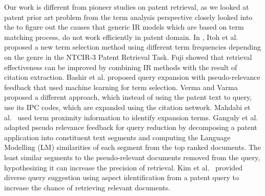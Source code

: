 

Our work is different from pioneer studies on patent retrieval, as we
looked at patent prior art problem from the term analysis perspective
closely looked into the to figure out the causes that generic IR models 
which are based on term matching process, do not work efficiently in patent domain. 
In \cite{Itoh2003}, Itoh et al. proposed a new term selection method using different term
frequencies depending on the genre in the NTCIR-3 Patent Retrieval Task.
Fuji \cite{Fujii2007}
showed that retrieval effectiveness can be improved by combining IR
methods with the result of citation extraction.
Bashir et al. \cite{Bashir2010} proposed query expansion with pseudo-relevance
feedback that used machine learning for term selection.
Verma and Varma
\cite{Verma2011} proposed a different approach, which instead of using
the patent text to query, use its IPC codes, which are expanded using the citation network.
Mahdabi et al.~\cite{Mahdabi2013} used term proximity
information to identify expansion terms. Ganguly et
al.~\cite{ganguly2011patent} adapted pseudo relevance feedback for
query reduction by decomposing a patent application into constituent
text segments and computing the Language Modelling (LM) similarities
of each segment from the top ranked documents. The least similar
segments to the pseudo-relevant documents removed from the query,
hypothesizing it can increase the precision of retrieval. Kim et
al.~\cite{kim2014diversifying} provided diverse query suggestion using
aspect identification from a patent query to increase the chance of
retrieving relevant documents. 












